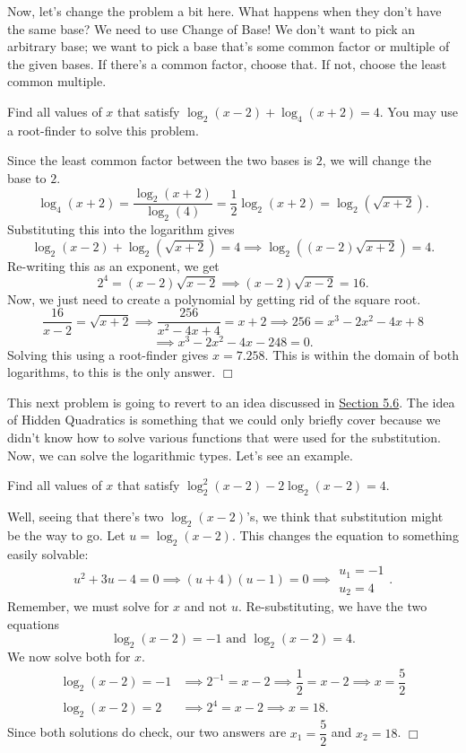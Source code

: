 \documentclass[lang=en,11pt]{elegantbook}
\begin{document}
Now, let's change the problem a bit here.  What happens when they don't have the same base?  We need to use Change of Base!  We don't want to pick an arbitrary base; we want to pick a base that's some common factor or multiple of the given bases.  If there's a common factor, choose that.  If not, choose the least common multiple.
\begin{example}
Find all values of $x$ that satisfy $\log_2(x-2)+\log_4(x+2)=4.$ You may use a root-finder to solve this problem.
\end{example}
\begin{solution}
Since the least common factor between the two bases is $2$, we will change the base to $2$.  $$\log_4(x+2)=\dfrac{\log_2(x+2)}{\log_2(4)}=\dfrac{1}{2}\log_2(x+2)=\log_2(\sqrt{x+2}).$$ Substituting this into the logarithm gives $$\log_2(x-2)+\log_2(\sqrt{x+2})=4 \implies \log_2\left((x-2)\sqrt{x+2}\right)=4.$$ Re-writing this as an exponent, we get $$2^4=(x-2)\sqrt{x-2} \implies (x-2)\sqrt{x-2}=16.$$  Now, we just need to create a polynomial by getting rid of the square root. $$\dfrac{16}{x-2}=\sqrt{x+2} \implies \dfrac{256}{x^2-4x+4}=x+2 \implies 256=x^3-2x^2-4x+8$$ $$\implies x^3-2x^2-4x-248=0.$$  Solving this using a root-finder gives $x=7.258$. This is within the domain of both logarithms, to this is the only answer. $\Box$
\end{solution}
This next problem is going to revert to an idea discussed in \hyperlink{section.5.6}{Section 5.6}.  The idea of Hidden Quadratics is something that we could only briefly cover because we didn't know how to solve various functions that were used for the substitution.  Now, we can solve the logarithmic types.  Let's see an example.
\begin{example}
Find all values of $x$ that satisfy $\log_2^2(x-2)-2\log_2(x-2)=4$.
\end{example}
\begin{solution}
Well, seeing that there's two $\log_2(x-2)$'s, we think that substitution might be the way to go.  Let $u=\log_2(x-2)$.  This changes the equation to something easily solvable: $$u^2+3u-4=0 \implies (u+4)(u-1)=0 \implies\begin{matrix} u_1=-1 \\ u_2=4 \end{matrix}.$$  Remember, we must solve for $x$ and not $u$.  Re-substituting, we have the two equations $$\log_2(x-2)=-1 \text{ and } \log_2(x-2)=4.$$  We now solve both for $x$. \begin{align*}
    \log_2(x-2)=-1 &\implies 2^{-1}=x-2 \implies \dfrac{1}{2}=x-2 \implies x=\dfrac{5}{2} \\ \log_2(x-2)=2 &\implies 2^{4}=x-2 \implies x=18.
\end{align*}
Since both solutions do check, our two answers are $x_1=\dfrac{5}{2}$ and $x_2=18$. $\Box$
\end{solution}
\end{document}
